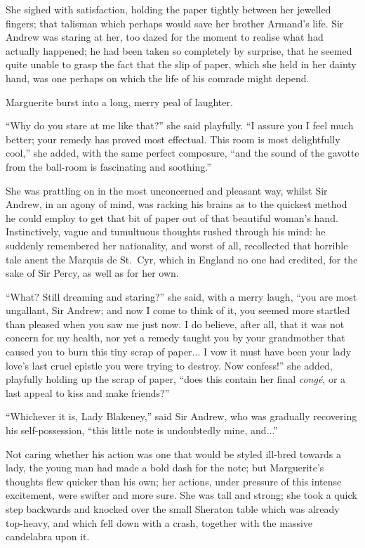 \documentclass[paper=5.5in:8.5in,BCOR=7mm,twoside,DIV=calc,12pt,usegeometry,chapterprefix,endperiod,headings=big]{scrbook}
\begin{document}
She sighed with satisfaction, holding the paper tightly between her jewelled fingers; that talisman which perhaps would save her brother Armand's life. Sir Andrew was staring at her, too dazed for the moment to realise what had actually happened; he had been taken so completely by surprise, that he seemed quite unable to grasp the fact that the slip of paper, which she held in her dainty hand, was one perhaps on which the life of his comrade might depend.

Marguerite burst into a long, merry peal of laughter.

\enquote{Why do you stare at me like that?} she said playfully. \enquote{I assure you I feel much better; your remedy has proved most effectual. This room is most delightfully cool,} she added, with the same perfect composure, \enquote{and the sound of the gavotte from the ball-room is fascinating and soothing.}

She was prattling on in the most unconcerned and pleasant way, whilst Sir Andrew, in an agony of mind, was racking his brains as to the quickest method he could employ to get that bit of paper out of that beautiful woman's hand. Instinctively, vague and tumultuous thoughts \newline rushed through his mind: he suddenly remembered her nationality, and worst of all, recollected that horrible tale anent the Marquis de St.~Cyr, which in England no one had credited, for the sake of Sir Percy, as well as for her own.

\enquote{What? Still dreaming and staring?} she said, with a merry laugh, \enquote{you are most ungallant, Sir Andrew; and now I come to think of it, you seemed more startled than pleased when you saw me just now. I do believe, after all, that it was not concern for my health, nor yet a remedy taught you by your grandmother that caused you to burn this tiny scrap of paper... I vow it must have been your lady love's last cruel epistle you were trying to destroy. Now confess!} she added, playfully holding up the scrap of paper, \enquote{does this contain her final \textit{congé}, or a last appeal to kiss and make friends?}

\enquote{Whichever it is, Lady Blakeney,} said Sir Andrew, who was gradually recovering his self-possession, \enquote{this little note is undoubtedly mine, and...}

Not caring whether his action was one that would be styled ill-bred towards a lady, the young man had made a bold dash for the note; but Marguerite's thoughts flew quicker than his own; her actions, under pressure of this intense excitement, were swifter and more sure. She was tall and strong; she took a quick step backwards and knocked over the small Sheraton table which was already top-heavy, and which fell down with a crash, together with the massive candelabra upon it.
\end{document}
